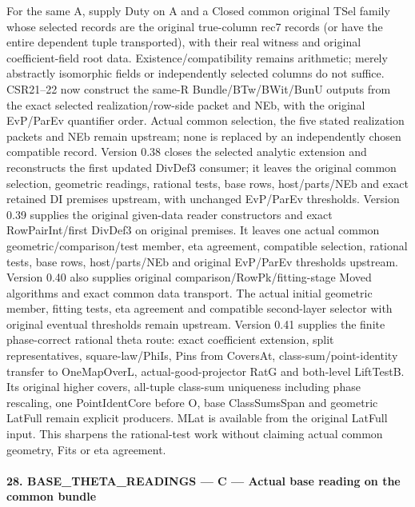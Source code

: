 \documentclass[11pt,a4paper]{article}
\numberwithin{equation}{section}
\theoremstyle{remark}\newtheorem{remark}[theorem]{Remark}
\begin{document}
For the same A, supply Duty on A and a Closed common original TSel family whose selected records are the original true-column rec7 records (or have the entire dependent tuple transported), with their real witness and original coefficient-field root data. Existence/compatibility remains arithmetic; merely abstractly isomorphic fields or independently selected columns do not suffice. CSR21–22 now construct the same-R Bundle/BTw/BWit/BunU outputs from the exact selected realization/row-side packet and NEb, with the original EvP/ParEv quantifier order. Actual common selection, the five stated realization packets and NEb remain upstream; none is replaced by an independently chosen compatible record. Version 0.38 closes the selected analytic extension and reconstructs the first updated DivDef3 consumer; it leaves the original common selection, geometric readings, rational tests, base rows, host/parts/NEb and exact retained DI premises upstream, with unchanged EvP/ParEv thresholds. Version 0.39 supplies the original given-data reader constructors and exact RowPairInt/first DivDef3 on original premises. It leaves one actual common geometric/comparison/test member, eta agreement, compatible selection, rational tests, base rows, host/parts/NEb and original EvP/ParEv thresholds upstream. Version 0.40 also supplies original comparison/RowPk/fitting-stage Moved algorithms and exact common data transport. The actual initial geometric member, fitting tests, eta agreement and compatible second-layer selector with original eventual thresholds remain upstream. Version 0.41 supplies the finite phase-correct rational theta route: exact coefficient extension, split representatives, square-law/PhiIs, Pins from CoversAt, class-sum/point-identity transfer to OneMapOverL, actual-good-projector RatG and both-level LiftTestB. Its original higher covers, all-tuple class-sum uniqueness including phase rescaling, one PointIdentCore before O, base ClassSumsSpan and geometric LatFull remain explicit producers. MLat is available from the original LatFull input. This sharpens the rational-test work without claiming actual common geometry, Fits or eta agreement.



\paragraph{28. BASE\_\allowbreak THETA\_\allowbreak READINGS — C — Actual base reading on the common bundle}
\end{document}
